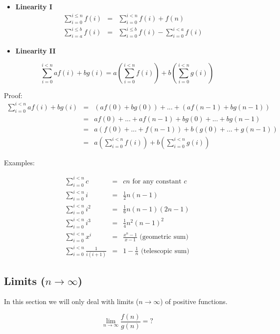 \documentclass[justified, sixbynine]{tufte-book}
\theoremstyle{plain}%
\newtheorem * {corollary}{Corollary}
\theoremstyle{definition}
\theoremstyle{remark}
\newtheorem * {remark}{Remark}
\newtheorem * {note}{Note}
\begin{document}
\begin{fullwidth}
\begin{itemize}
\item  {\bf Linearity I}
\begin{eqnarray}
\sum_{i=0}^{i\leq n}f(i) &=&\sum_{i=0}^{i<n}f(i)+f(n) \\
\sum_{i=a}^{i\leq b}f(i) &=&\sum_{i=0}^{i\leq b}f(i)-\sum_{i=0}^{i<a}f(i)
\end{eqnarray}

\item  {\bf Linearity II}
\end{itemize}

\begin{equation}
\sum_{i=0}^{i<n}af(i)+bg(i)=a\left( \sum_{i=0}^{i<n}f(i)\right) +b\left(
\sum_{i=0}^{i<n}g(i)\right)
\end{equation}

Proof:
\begin{eqnarray}
\sum_{i=0}^{i<n}af(i)+bg(i) &=&\left( af(0)+bg(0)\right) +...+\left(
af(n-1)+bg(n-1)\right)  \nonumber \\
&=&af(0)+...+af(n-1)+bg(0)+...+bg(n-1)  \nonumber \\
&=&a\left( f(0)+...+f(n-1)\right) +b\left( g(0)+...+g(n-1)\right)  \nonumber
\\
&=&a\left( \sum_{i=0}^{i<n}f(i)\right) +b\left( \sum_{i=0}^{i<n}g(i)\right)
\end{eqnarray}

Examples:

\begin{eqnarray}
\sum_{i=0}^{i<n}c &=&cn\text{ for any constant }c \\
\sum_{i=0}^{i<n}i &=&\frac 12n(n-1) \\
\sum_{i=0}^{i<n}i^2 &=&\frac 16n(n-1)(2n-1) \\
\sum_{i=0}^{i<n}i^3 &=&\frac 14n^2(n-1)^2 \\
\sum_{i=0}^{i<n}x^i &=&\frac{x^n-1}{x-1}\text{ (geometric sum)} \\
\sum_{i=0}^{i<n}\frac 1{i(i+1)} &=&1-\frac 1n\text{ (telescopic sum)}
\end{eqnarray}


\goodbreak\subsection{Limits ($n\rightarrow \infty $)}

In this section we will only deal with limits ($n\rightarrow \infty $) of
positive functions.

\begin{equation}
\lim_{n\rightarrow \infty }\frac{f(n)}{g(n)}=?
\end{equation}


\end{fullwidth}
\end{document}
